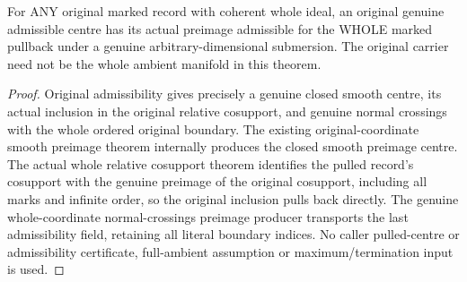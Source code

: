 \begin{theorem}
\label{hir:submersion-controlled-actual-admissibility}
\leanok
{}
For ANY original marked record with coherent whole ideal, an original
genuine admissible centre has its actual preimage admissible for the WHOLE
marked pullback under a genuine arbitrary-dimensional submersion. The
original carrier need not be the whole ambient manifold in this theorem.
\end{theorem}
\begin{proof}
Original admissibility gives precisely a genuine closed smooth centre,
its actual inclusion in the original relative cosupport, and genuine
normal crossings with the whole ordered original boundary. The existing
original-coordinate smooth preimage theorem internally produces the
closed smooth preimage centre. The actual whole relative cosupport theorem
identifies the pulled record's cosupport with the genuine preimage of the
original cosupport, including all marks and infinite order, so the original
inclusion pulls back directly. The genuine whole-coordinate normal-crossings
preimage producer transports the last admissibility field, retaining all
literal boundary indices. No caller pulled-centre or admissibility
certificate, full-ambient assumption or maximum/termination input is used.
\end{proof}

